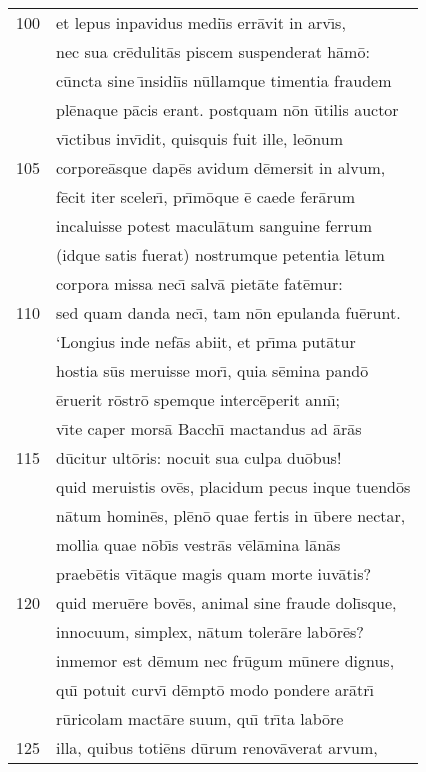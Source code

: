 \documentclass[paper=6in:9in,pagesize=pdftex,
               headinclude=on,footinclude=on,12pt]{scrbook}
\begin{document}
\begin{longtable}[p]{ r l }
100 & et lepus inpavidus medi\={\i}s err\=avit in arv\={\i}s,\\ 
 & nec sua cr\=edulit\=as piscem suspenderat h\=am\=o:\\ 
 & c\=uncta sine \={\i}nsidi\={\i}s n\=ullamque timentia fraudem\\ 
 & pl\=enaque p\=acis erant. postquam n\=on \=utilis auctor\\ 
 & v\={\i}ctibus inv\={\i}dit, quisquis fuit ille, le\=onum\\ 
105 & corpore\=asque dap\=es avidum d\=emersit in alvum,\\ 
 & f\=ecit iter sceler\={\i}, pr\={\i}m\=oque \=e caede fer\=arum\\ 
 & incaluisse potest macul\=atum sanguine ferrum\\ 
 & (idque satis fuerat) nostrumque petentia l\=etum\\ 
 & corpora missa nec\={\i} salv\=a piet\=ate fat\=emur:\\ 
110 & sed quam danda nec\={\i}, tam n\=on epulanda fu\=erunt.\\ 
 & \indent `Longius inde nef\=as abiit, et pr\={\i}ma put\=atur\\ 
 & hostia s\=us meruisse mor\={\i}, quia s\=emina pand\=o\\ 
 & \=eruerit r\=ostr\=o spemque interc\=eperit ann\={\i};\\ 
 & v\={\i}te caper mors\=a Bacch\={\i} mactandus ad \=ar\=as\\ 
115 & d\=ucitur ult\=oris: nocuit sua culpa du\=obus!\\ 
 & quid meruistis ov\=es, placidum pecus inque tuend\=os\\ 
 & n\=atum homin\=es, pl\=en\=o quae fertis in \=ubere nectar,\\ 
 & mollia quae n\=ob\={\i}s vestr\=as v\=el\=amina l\=an\=as\\ 
 & praeb\=etis v\={\i}t\=aque magis quam morte iuv\=atis?\\ 
120 & quid meru\=ere bov\=es, animal sine fraude dol\={\i}sque,\\ 
 & innocuum, simplex, n\=atum toler\=are lab\=or\=es?\\ 
 & inmemor est d\=emum nec fr\=ugum m\=unere dignus,\\ 
 & qu\={\i} potuit curv\={\i} d\=empt\=o modo pondere ar\=atr\={\i}\\ 
 & r\=uricolam mact\=are suum, qu\={\i} tr\={\i}ta lab\=ore\\ 
125 & illa, quibus toti\=ens d\=urum renov\=averat arvum,\\ 

\end{longtable}
\end{document}
